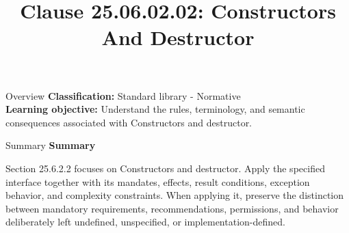 \documentclass[10pt,letterpaper]{article}
\title{Clause 25.06.02.02: Constructors And Destructor}
\author{}
\date{}
\begin{document}
\maketitle
\begin{CornellOverviewBox}{Overview}
\textbf{Classification:} Standard library - Normative\\[2pt]
\textbf{Learning objective:} Understand the rules, terminology, and semantic consequences associated with Constructors and destructor.
\end{CornellOverviewBox}\begin{CornellSummaryBox}{Summary}
{\sffamily\bfseries\color{Accent} Summary}\par\vspace{3pt}Section 25.6.2.2 focuses on Constructors and destructor. Apply the specified interface together with its mandates, effects, result conditions, exception behavior, and complexity constraints. When applying it, preserve the distinction between mandatory requirements, recommendations, permissions, and behavior deliberately left undefined, unspecified, or implementation-defined.
\end{CornellSummaryBox}
\end{document}
